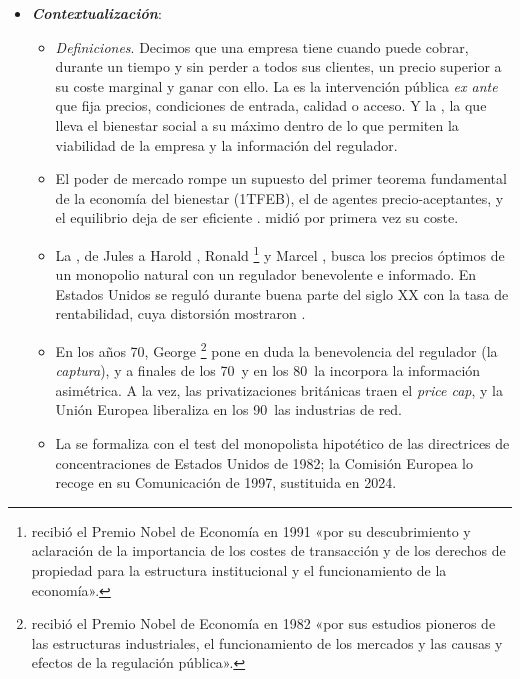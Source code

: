 \documentclass[11pt]{article}
\begin{document}
\begin{itemize}
\item \textbf{\emph{Contextualización}}:
  \begin{itemize}
  \item \emph{Definiciones}. Decimos que una empresa tiene  cuando puede cobrar, durante un tiempo y sin perder a todos sus clientes, un precio superior a su coste marginal y ganar con ello. La  es la intervención pública \emph{ex ante} que fija precios, condiciones de entrada, calidad o acceso. Y la , la que lleva el bienestar social a su máximo dentro de lo que permiten la viabilidad de la empresa y la información del regulador.
  \item El poder de mercado rompe un supuesto del primer teorema fundamental de la economía del bienestar (1TFEB), el de agentes precio-aceptantes, y el equilibrio deja de ser eficiente  . \textcite{Harberger1954Monopoly} midió por primera vez su coste.
  \item La , de Jules \textcite{Dupuit1844Mesure} a Harold \textcite{Hotelling1938General}, Ronald \textcite{Coase1946Marginal}\footnote{ recibió el Premio Nobel de Economía en 1991 «por su descubrimiento y aclaración de la importancia de los costes de transacción y de los derechos de propiedad para la estructura institucional y el funcionamiento de la economía»\nocite{Nobel1991Coase}.} y Marcel \textcite{Boiteux1956Gestion}, busca los precios óptimos de un monopolio natural con un regulador benevolente e informado. En Estados Unidos se reguló durante buena parte del siglo XX con la tasa de rentabilidad, cuya distorsión mostraron \textcite{AverchJohnson1962Behavior}.
  \item En los años 70, George \textcite{Stigler1971Theory}\footnote{ recibió el Premio Nobel de Economía en 1982 «por sus estudios pioneros de las estructuras industriales, el funcionamiento de los mercados y las causas y efectos de la regulación pública»\nocite{Nobel1982Stigler}.} pone en duda la benevolencia del regulador (la \emph{captura}), y a finales de los 70~y en los 80~la  incorpora la información asimétrica\nocite{LoebMagat1979Decentralized,BaronMyerson1982Regulating,LaffontTirole1986Using,LaffontTirole1993Theory}. A la vez, las privatizaciones británicas traen el \emph{price cap}\nocite{Littlechild1983Regulation}, y la Unión Europea liberaliza en los 90~las industrias de red.
  \item La  se formaliza con el test del monopolista hipotético de las directrices de concentraciones de Estados Unidos de 1982\nocite{DOJ1982Merger}; la Comisión Europea lo recoge en su Comunicación de 1997, sustituida en 2024\nocite{CE2024DefinicionMercado}.
  \end{itemize}


\end{itemize}
\end{document}
